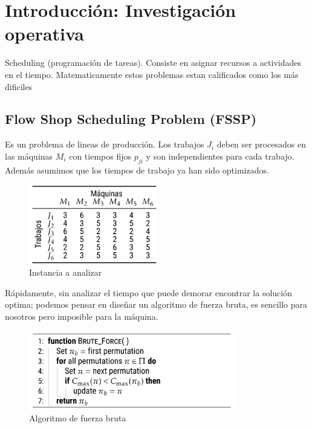 \documentclass[10pt, a4paper]{article}
\begin{document}
\section{Introducción: Investigación
operativa}\label{sec:introduction-operations-research}

Scheduling (programación de tareas). Consiste en asignar recursos a actividades en
el tiempo. Matematicamente estos problemas estan calificados como los más 
dificiles

\subsection{Flow Shop Scheduling Problem
(FSSP)}\label{sec:flow-shop-scheduling-problem-fssp}

Es un problema de lineas de producción. Los trabajos $J_i$ deben ser procesados 
en las máquinas $M_i$ con tiempos fijos $p_{ji}$ y son independientes para cada 
trabajo. Además asumimos que los tiempos de trabajo ya han sido optimizados.

\begin{figure}[H]
  \centering
  \includegraphics[width=0.5\textwidth]{./.github/1733238439.png}
  \caption{Instancia a analizar}\label{fig:instance-of-analysis}
\end{figure}

Rápidamente, sin analizar el tiempo que puede demorar encontrar la solución 
optima; podemos pensar en diseñar un algoritmo de fuerza bruta, es sencillo 
para nosotros pero imposible para la máquina.

\begin{figure}[H]
  \centering
  \includegraphics[width=0.8\textwidth]{./.github/1733239898.png}
  \caption{Algoritmo de fuerza bruta}\label{fig:brute-force-algoritm}
\end{figure}
\end{document}
